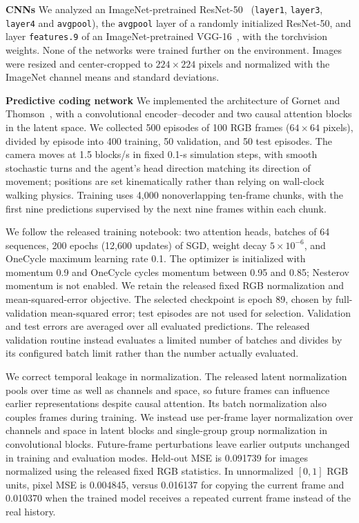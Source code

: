 \documentclass[11pt]{article}
\begin{document}
{\bf CNNs}
We analyzed an ImageNet-pretrained ResNet-50~\cite{He2016} (\texttt{layer1}, \texttt{layer3}, \texttt{layer4} and \texttt{avgpool}), the \texttt{avgpool} layer of a randomly initialized ResNet-50, and layer \texttt{features.9} of an ImageNet-pretrained VGG-16~\cite{Simonyan2015}, with the torchvision weights. None of the networks were trained further on the environment. Images were resized and center-cropped to $224\times224$ pixels and normalized with the ImageNet channel means and standard deviations.

{\bf Predictive coding network}
We implemented the architecture of Gornet and Thomson~\cite{Gornet2024automated}, with a convolutional encoder--decoder and two causal attention blocks in the latent space. We collected 500 episodes of 100 RGB frames ($64\times64$ pixels), divided by episode into 400 training, 50 validation, and 50 test episodes. The camera moves at 1.5 blocks/s in fixed 0.1-s simulation steps, with smooth stochastic turns and the agent's head direction matching its direction of movement; positions are set kinematically rather than relying on wall-clock walking physics. Training uses 4{,}000 nonoverlapping ten-frame chunks, with the first nine predictions supervised by the next nine frames within each chunk.

We follow the released training notebook: two attention heads, batches of 64 sequences, 200 epochs (12{,}600 updates) of SGD, weight decay $5\times10^{-6}$, and OneCycle maximum learning rate 0.1. The optimizer is initialized with momentum 0.9 and OneCycle cycles momentum between 0.95 and 0.85; Nesterov momentum is not enabled. We retain the released fixed RGB normalization and mean-squared-error objective. The selected checkpoint is epoch 89, chosen by full-validation mean-squared error; test episodes are not used for selection. Validation and test errors are averaged over all evaluated predictions. The released validation routine instead evaluates a limited number of batches and divides by its configured batch limit rather than the number actually evaluated.

We correct temporal leakage in normalization. The released latent normalization pools over time as well as channels and space, so future frames can influence earlier representations despite causal attention. Its batch normalization also couples frames during training. We instead use per-frame layer normalization over channels and space in latent blocks and single-group group normalization in convolutional blocks. Future-frame perturbations leave earlier outputs unchanged in training and evaluation modes. Held-out MSE is 0.091739 for images normalized using the released fixed RGB statistics. In unnormalized $[0,1]$ RGB units, pixel MSE is 0.004845, versus 0.016137 for copying the current frame and 0.010370 when the trained model receives a repeated current frame instead of the real history.
\end{document}

